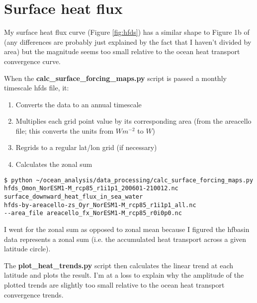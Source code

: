 \section{Surface heat flux}

My surface heat flux curve (Figure \ref{fig:hfds}) has a similar shape to Figure 1b of \citet{Nummelin_2017} (any differences are probably just explained by the fact that I haven't divided by area) but the magnitude seems too small relative to the ocean heat transport convergence curve.

When the \textbf{calc_surface_forcing_maps.py} script is passed a monthly timescale hfds file, it:
\begin{enumerate}
\item Converts the data to an annual timescale
\item Multiplies each grid point value by its corresponding area (from the areacello file; this converts the units from $Wm^{-2}$ to $W$)
\item Regrids to a regular lat/lon grid (if necessary)
\item Calculates the zonal sum
\end{enumerate}

\begin{verbatim}
$ python ~/ocean_analysis/data_processing/calc_surface_forcing_maps.py
hfds_Omon_NorESM1-M_rcp85_r1i1p1_200601-210012.nc 
surface_downward_heat_flux_in_sea_water 
hfds-by-areacello-zs_Oyr_NorESM1-M_rcp85_r1i1p1_all.nc 
--area_file areacello_fx_NorESM1-M_rcp85_r0i0p0.nc
\end{verbatim}

I went for the zonal sum as opposed to zonal mean because I figured the hfbasin data represents a zonal sum (i.e. the accumulated heat transport across a given latitude circle).

The \textbf{plot_heat_trends.py} script then calculates the linear trend at each latitude and plots the result. I'm at a loss to explain why the amplitude of the plotted trends are slightly too small relative to the ocean heat transport convergence trends.



